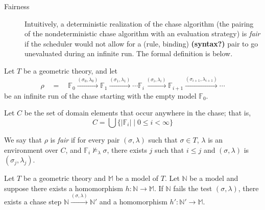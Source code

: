 		\label{fairness_definition}
		\begin{description}
		\item [Fairness] Intuitively, a deterministic realization of the chase
		algorithm (the pairing of the nondeterministic chase algorithm with an
		evaluation strategy) is \emph{fair} if the scheduler would not allow
		for a (rule, binding) \textbf{(syntax?)} pair to go unevaluated during
		an infinite run. The formal definition is below.
		\end{description}

		\begin{definition}
		Let $T$ be a geometric theory, and let
			\[
			\rho \quad = \quad \mathbb{F}_0 \xrightarrow{(\sigma_0,\lambda_0)}
			\mathbb{F}_1 \xrightarrow{(\sigma_1,\lambda_1)} %
			\cdots \mathbb{F}_{i} \xrightarrow{(\sigma_i,\lambda_i)}
			\mathbb{F}_{i+1} \xrightarrow{(\sigma_{i+1},\lambda_{i+1})} \cdots
			\]
		be an infinite run of the chase starting with the empty model $\mathbb{F}_0$.

		Let $C$ be the set of domain elements that occur anywhere in the chase;
		that is,
			\[
			C = \bigcup \{ | \mathbb{F}_{i} | \mid 0 \leq i < \infty \}
			\]

		We say that $\rho$ is \emph{fair} if for every pair $(\sigma,\lambda)$
		such that $\sigma \in T$, $\lambda$ is an environment over $C$, and
		$\mathbb{F}_i \not\models_{\lambda} \sigma$, there exists $j$ such that
		$i \leq j$ and $(\sigma,\lambda)$ is $(\sigma_j,\lambda_j)$.
		\end{definition}

		\begin{lemma}
			\label{lemma_chase_step_minimality_preservation}
			Let $T$ be a geometric theory and $\mathbb{M}$ be a model of $T$.
			Let $\mathbb{N}$ be a model and suppose there exists a homomorphism
			$h : \mathbb{N} \to \mathbb{M}$. If $\mathbb{N}$ fails the test
			$(\sigma,\lambda)$, there exists a chase step $\mathbb{N}
			\xrightarrow{(\sigma,\lambda)} \mathbb{N}'$ and a homomorphism $h'
			: \mathbb{N}' \to \mathbb{M}$.
		\end{lemma}

